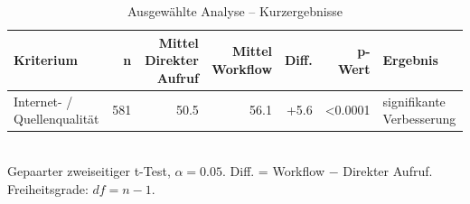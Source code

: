 \begin{table}[htbp]
\centering
\caption{Ausgewählte Analyse -- Kurzergebnisse}
\begin{tabular}{lrrrrrl}
\toprule
Kriterium & n & Mittel Direkter Aufruf & Mittel Workflow & Diff. & p-Wert & Ergebnis \\
\midrule
Internet- / Quellenqualität & 581 & 50.5 & 56.1 & +5.6 & <0.0001 & signifikante Verbesserung \\
\bottomrule
\end{tabular}
\\[2mm]
\footnotesize Gepaarter zweiseitiger t-Test, $\alpha=0.05$. Diff. = Workflow $-$ Direkter Aufruf. Freiheitsgrade: $df=n-1$.
\end{table}
